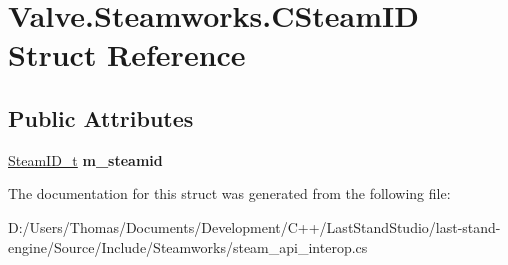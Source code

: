 \hypertarget{structValve_1_1Steamworks_1_1CSteamID}{}\section{Valve.\+Steamworks.\+C\+Steam\+I\+D Struct Reference}
\label{structValve_1_1Steamworks_1_1CSteamID}
\subsection*{Public Attributes}
\begin{DoxyCompactItemize}
\item 
\hypertarget{structValve_1_1Steamworks_1_1CSteamID_a4782ad4d751e9c04063a292d968512ca}{}\hyperlink{structValve_1_1Steamworks_1_1SteamID__t}{Steam\+I\+D\+\_\+t} {\bfseries m\+\_\+steamid}\label{structValve_1_1Steamworks_1_1CSteamID_a4782ad4d751e9c04063a292d968512ca}

\end{DoxyCompactItemize}


The documentation for this struct was generated from the following file\+:\begin{DoxyCompactItemize}
\item 
D\+:/\+Users/\+Thomas/\+Documents/\+Development/\+C++/\+Last\+Stand\+Studio/last-\/stand-\/engine/\+Source/\+Include/\+Steamworks/steam\+\_\+api\+\_\+interop.\+cs\end{DoxyCompactItemize}
